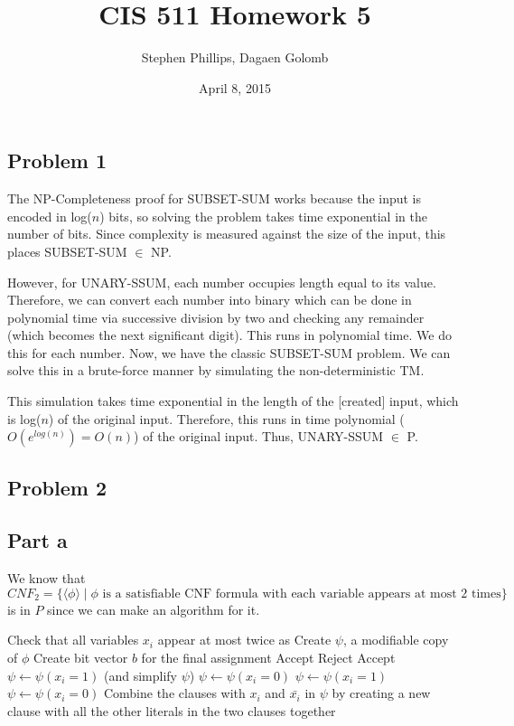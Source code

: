 \documentclass[english]{article}
\title{CIS 511 Homework 5}
\author{Stephen Phillips, Dagaen Golomb}
\date{April 8, 2015}
\begin{document}
\maketitle
\subsection*{Problem 1}
The NP-Completeness proof for SUBSET-SUM works because the input is encoded in log($n$) bits, so
solving the problem takes time exponential in the number of bits. Since complexity is measured
against the size of the input, this places SUBSET-SUM $\in$ NP.

However, for UNARY-SSUM, each number occupies length equal to its value. Therefore, we can convert
each number into binary which can be done in polynomial time via successive division by two and
checking any remainder (which becomes the next significant digit). This runs in polynomial time.
We do this for each number. Now, we have the classic SUBSET-SUM problem. We can solve this in a
brute-force manner by simulating the non-deterministic TM.

This simulation takes time exponential
in the length of the [created] input, which is log($n$) of the original input. Therefore, this
runs in time polynomial ($O(e^{log(n)}) = O(n)$) of the original input. Thus, UNARY-SSUM $\in$ P.

\subsection*{Problem 2}
\subsection*{Part a}
We know that $CNF_2 = \{\langle \phi \rangle \mid \phi \textrm{ is a satisfiable CNF formula with each 
variable appears at most 2 times}\}$ is in $P$ since we can make an algorithm for it.

\begin{algorithmic}
  \State Check that all variables $x_i$ appear at most twice as 
  \State Create $\psi$, a modifiable copy of $\phi$
  \State Create bit vector $b$ for the final assignment
      \State Accept
        \State Reject
      \Else
        \State Accept
      \EndIf
      \State $\psi \leftarrow \psi(x_i=1)$ (and simplify $\psi$)
      \State $\psi \leftarrow \psi(x_i=0)$
      \State $\psi \leftarrow \psi(x_i=1)$
      \State $\psi \leftarrow \psi(x_i=0)$
    \Else
      \State Combine the clauses with $x_i$ and $\bar{x_i}$ in $\psi$ by creating a new clause with all the
              other literals in the two clauses together
    \EndIf
  \EndFor
\EndFunction 
\end{algorithmic}
\end{document}

